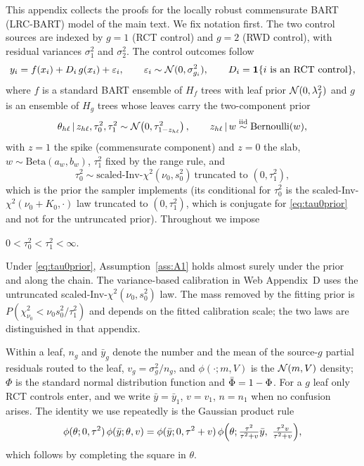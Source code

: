 This appendix collects the proofs for the locally robust commensurate BART (LRC-BART) model of the main text. We fix notation first. The two control sources are indexed by $g=1$ (RCT control) and $g=2$ (RWD control), with residual variances $\sigma_1^2$ and $\sigma_2^2$. The control outcomes follow
\begin{equation}
y_i=f(x_i)+D_i\,g(x_i)+\varepsilon_i,\qquad \varepsilon_i\sim\Normal(0,\sigma^2_{g_i}),\qquad D_i=\mathbf 1\{i\ \text{is an RCT control}\},
\label{eqA:model}
\end{equation}
where $f$ is a standard BART ensemble of $H_f$ trees with leaf prior $\mathcal{N}(0,\lambda_f^2)$ and $g$ is an ensemble of $H_g$ trees whose leaves carry the two-component prior
\begin{equation}
\theta_{h\ell}\,\vert\, z_{h\ell},\tau_0^2,\tau_1^2\sim\mathcal{N}\!\left(0,\tau_{1-z_{h\ell}}^2\right),\qquad z_{h\ell}\,\vert\, w\stackrel{\text{iid}}{\sim}\mathrm{Bernoulli}(w),
\label{eqA:leafprior}
\end{equation}
with $z=1$ the spike (commensurate component) and $z=0$ the slab, $w\sim\mathrm{Beta}(a_w,b_w)$, $\tau_1^2$ fixed by the range rule, and
\begin{equation}
\tau_0^2\sim\text{scaled-Inv-}\chi^2(\nu_0,s_0^2)\ \text{truncated to }(0,\tau_1^2),
\label{eq:tau0prior}
\end{equation}
which is the prior the sampler implements (its conditional for $\tau_0^2$ is the scaled-Inv-$\chi^2(\nu_0+K_0,\cdot)$ law truncated to $(0,\tau_1^2)$, which is conjugate for \eqref{eq:tau0prior} and not for the untruncated prior). Throughout we impose
\begin{assA}[(A1)]\label{ass:A1}
$0<\tau_0^2<\tau_1^2<\infty$.
\end{assA}
\noindent Under \eqref{eq:tau0prior}, Assumption~\ref{ass:A1} holds almost surely under the prior and along the chain. The variance-based calibration in Web Appendix~D uses the untruncated scaled-Inv-$\chi^2(\nu_0,s_0^2)$ law. The mass removed by the fitting prior is $P(\chi^2_{\nu_0}<\nu_0s_0^2/\tau_1^2)$ and depends on the fitted calibration scale; the two laws are distinguished in that appendix.

Within a leaf, $n_g$ and $\bar y_g$ denote the number and the mean of the source-$g$ partial residuals routed to the leaf, $v_g=\sigma_g^2/n_g$, and $\phi(\cdot;m,V)$ is the $\mathcal{N}(m,V)$ density; $\Phi$ is the standard normal distribution function and $\bar\Phi=1-\Phi$. For a $g$ leaf only RCT controls enter, and we write $\bar y=\bar y_1$, $v=v_1$, $n=n_1$ when no confusion arises. The identity we use repeatedly is the Gaussian product rule
\begin{equation}
\phi(\theta;0,\tau^2)\,\phi(\bar y;\theta,v)=\phi(\bar y;0,\tau^2+v)\,\phi\Bigl(\theta;\tfrac{\tau^2}{\tau^2+v}\bar y,\ \tfrac{\tau^2 v}{\tau^2+v}\Bigr),
\label{eq:gaussprod}
\end{equation}
which follows by completing the square in $\theta$.

